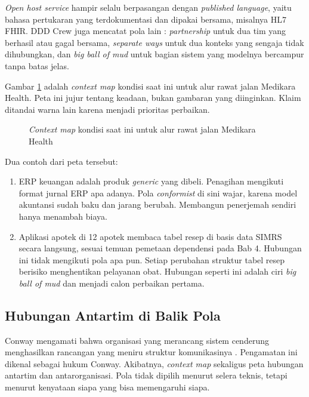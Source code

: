 \textit{Open host service} hampir selalu berpasangan dengan \textit{published language}, yaitu
bahasa pertukaran yang terdokumentasi dan dipakai bersama, misalnya HL7 FHIR. DDD Crew juga
mencatat pola lain \cite{c06-dddcrew-contextmap}: \textit{partnership} untuk dua tim yang berhasil
atau gagal bersama, \textit{separate ways} untuk dua konteks yang sengaja tidak dihubungkan, dan
\textit{big ball of mud} untuk bagian sistem yang modelnya bercampur tanpa batas jelas.

Gambar \ref{fig:ch06-context-map} adalah \textit{context map} kondisi saat ini untuk alur rawat
jalan Medikara Health. Peta ini jujur tentang keadaan, bukan gambaran yang diinginkan. Klaim
ditandai warna lain karena menjadi prioritas perbaikan.

\begin{figure}[!htb]
  \centering
  
  \caption{\textit{Context map} kondisi saat ini untuk alur rawat jalan Medikara Health}
  \label{fig:ch06-context-map}
\end{figure}

Dua contoh dari peta tersebut:
\begin{enumerate}
  \item ERP keuangan adalah produk \textit{generic} yang dibeli. Penagihan mengikuti format jurnal
        ERP apa adanya. Pola \textit{conformist} di sini wajar, karena model akuntansi sudah baku
        dan jarang berubah. Membangun penerjemah sendiri hanya menambah biaya.
  \item Aplikasi apotek di 12 apotek membaca tabel resep di basis data SIMRS secara langsung,
        sesuai temuan pemetaan dependensi pada Bab 4. Hubungan ini tidak mengikuti pola apa pun.
        Setiap perubahan struktur tabel resep berisiko menghentikan pelayanan obat. Hubungan
        seperti ini adalah ciri \textit{big ball of mud} dan menjadi calon perbaikan pertama.
\end{enumerate}

\subsection{Hubungan Antartim di Balik Pola}

Conway mengamati bahwa organisasi yang merancang sistem cenderung menghasilkan rancangan yang
meniru struktur komunikasinya \cite{conway1968}. Pengamatan ini dikenal sebagai hukum Conway.
Akibatnya, \textit{context map} sekaligus peta hubungan antartim dan antarorganisasi. Pola tidak
dipilih menurut selera teknis, tetapi menurut kenyataan siapa yang bisa memengaruhi siapa.

